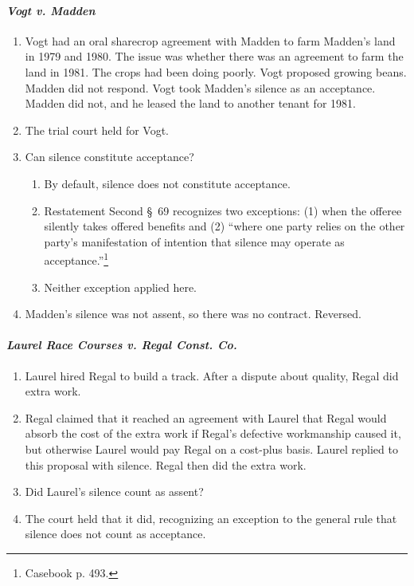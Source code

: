 \paragraph{\emph{Vogt v. Madden}}

\begin{enumerate}
    \item Vogt had an oral sharecrop agreement with Madden to farm Madden's 
    land in 1979 and 1980. The issue was whether there was an agreement to 
    farm the land in 1981. The crops had been doing poorly. Vogt proposed 
    growing beans. Madden did not respond. Vogt took Madden's silence as an 
    acceptance. Madden did not, and he leased the land to another tenant for 
    1981.
    \item The trial court held for Vogt.
    \item Can silence constitute acceptance?
    \begin{enumerate}
        \item By default, silence does not constitute acceptance.
        \item Restatement Second \S\ 69 recognizes two exceptions: (1) when 
        the offeree silently takes offered benefits and (2) ``where one party 
        relies on the other party's manifestation of intention that silence 
        may operate as acceptance.''\footnote{Casebook p. 493.}
        \item Neither exception applied here.
    \end{enumerate}
    \item Madden's silence was not assent, so there was no contract. Reversed.
\end{enumerate}

\paragraph{\emph{Laurel Race Courses v. Regal Const. Co.}}

\begin{enumerate}
    \item Laurel hired Regal to build a track. After a dispute about quality, 
    Regal did extra work.
    \item Regal claimed that it reached an agreement with Laurel that Regal 
    would absorb the cost of the extra work if Regal's defective workmanship 
    caused it, but otherwise Laurel would pay Regal on a cost-plus basis. 
    Laurel replied to this proposal with silence. Regal then did the extra work.
    \item Did Laurel's silence count as assent?
    \item The court held that it did, recognizing an exception to the general 
    rule that silence does not count as acceptance.
\end{enumerate}

